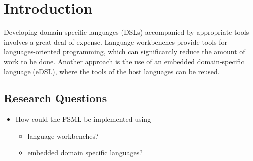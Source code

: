 \chapter{Introduction}

Developing domain-specific languages (DSLs) accompanied by appropriate tools involves a great deal of expense.
Language workbenches provide tools for languages-oriented programming, which can significantly reduce the amount of work to be done.
Another approach is the use of an embedded domain-specific language (eDSL), where the tools of the host languages can be reused.

\section{Research Questions}

\begin{itemize}
	\item How could the FSML be implemented using
	\begin{itemize}
		\item language workbenches?
		\item embedded domain specific languages?
	\end{itemize}
\end{itemize}

